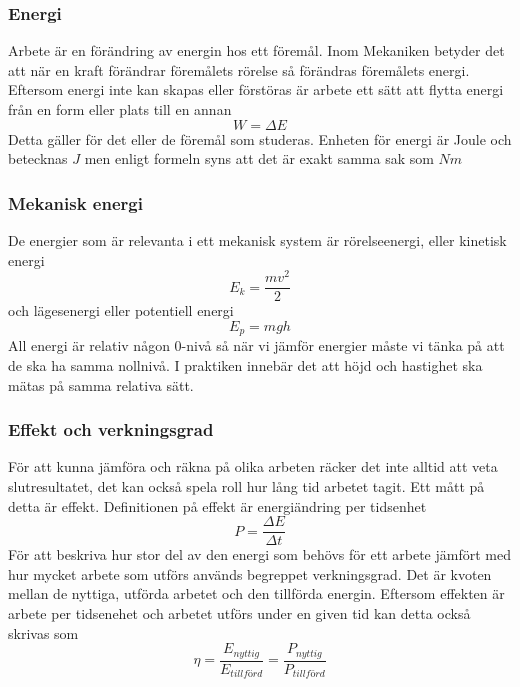 \documentclass[11pt]{beamer}
\begin{document}
    \begin{frame}
        \frametitle{Energi}
        Arbete är en förändring av energin hos ett föremål. Inom Mekaniken betyder det att när en kraft förändrar
        föremålets rörelse så förändras föremålets energi. Eftersom energi inte kan skapas eller förstöras är arbete
        ett sätt att flytta energi från en form eller plats till en annan
        \begin{equation}
            W = \Delta E
        \end{equation}
        Detta gäller för det eller de föremål som studeras. Enheten för energi är Joule och betecknas $J$ men enligt
        formeln syns att det är exakt samma sak som $Nm$
    \end{frame}

    \begin{frame}
        \frametitle{Mekanisk energi}
        De energier som är relevanta i ett mekanisk system är rörelseenergi, eller kinetisk energi
        \begin{equation}
            E_k = \frac{mv^2}{2}
        \end{equation}
        och lägesenergi eller potentiell energi
        \begin{equation}
            E_p = mgh
        \end{equation}
        All energi är relativ någon 0-nivå så när vi jämför energier måste vi tänka på att de ska ha samma nollnivå.
        I praktiken innebär det att höjd och hastighet ska mätas på samma relativa sätt.
    \end{frame}
    \begin{frame}
        \frametitle{Effekt och verkningsgrad}
        För att kunna jämföra och räkna på olika arbeten räcker det inte alltid att veta slutresultatet, det kan också
        spela roll hur lång tid arbetet tagit. Ett mått på detta är effekt. Definitionen på effekt är energiändring per tidsenhet
        \begin{equation}
            P = \frac{\Delta E}{\Delta t}
        \end{equation}
        För att beskriva hur stor del av den energi som behövs för ett arbete jämfört med hur mycket arbete som utförs
        används begreppet verkningsgrad.  Det är kvoten mellan de nyttiga, utförda arbetet och den tillförda energin.
        Eftersom effekten är arbete per tidsenehet och arbetet utförs under en given tid kan detta också skrivas som
        \begin{equation}
            \eta = \frac{E_{nyttig}}{E_{tillförd}} = \frac{P_{nyttig}}{P_{tillförd}}
        \end{equation}

    \end{frame}
\end{document}
